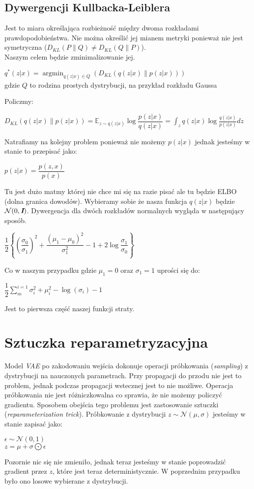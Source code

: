 \documentclass[a4paper,12pt]{book} %
\begin{document}
\subsection{Dywergencji Kullbacka-Leiblera}
Jest to miara określająca rozbieżność między dwoma rozkładami prawdopodobieństwa. Nie można określić jej mianem metryki ponieważ nie jest symetryczna ($D_{KL}(P\|Q)\neq  D_{KL}(Q\|P)$).\\ Naszym celem będzie zminimalizowanie jej.
\begin{center}
	$q^\ast(z|x)=\operatorname*{argmin}_{q(z|x)\in Q}(D_{KL}(q(z|x)\|p(z|x)))$
	\\gdzie $Q$ to rodzina prostych dystrybucji, na przykład rozkładu Gaussa 
\end{center}
Policzmy:
\begin{center}
	$D_{KL}(q(z|x)\|p(z|x))=\mathbb{E}_{z\sim q(z|x)}\log\dfrac{p(z|x)}{q(z|x)} = 
	\displaystyle\int_{z}^{}q(z|x)\log\frac{q(z|x)}{p(z|x)}dz$
\end{center}
	 Natrafiamy na kolejny problem ponieważ nie możemy $p(z|x)$ jednak jesteśmy w stanie to przepisać jako:\\
\begin{center}
	$p(z|x)=\dfrac{p(z,x)}{p(x)}$
\end{center}
Tu jest dużo matmy której nie chce mi się na razie pisać ale tu będzie ELBO (dolna granica dowodów).
\newpage
Wybieramy sobie że nasza funkcja $q(z|x)$ będzie $\mathcal{N}(0, \textit{\textbf{I}})$.
Dywergencja dla dwóch rozkładów normalnych wygląda w następujący sposób. 
\begin{center}
	$\dfrac{1}{2}\left\{\left(\dfrac{\sigma_0}{\sigma_1}\right)^2+\dfrac{(\mu_1 - \mu_0)^2}{\sigma_1^2} - 1 + 2\log\dfrac{\sigma_1}{\sigma_0}\right\}$
\end{center}
Co w naszym przypadku gdzie $\mu_1 = 0$ oraz $\sigma_1=1$ uprości się do:
\begin{center}
	$\dfrac{1}{2}\displaystyle\sum_{m}^{i=1}\sigma_i^2+\mu_i^2-\log(\sigma_i)-1$
\end{center} 
Jest to pierwsza część naszej funkcji straty. 
\newpage
\section{Sztuczka reparametryzacyjna}
Model \textit{VAE} po zakodowaniu wejścia dokonuje operacji próbkowania (\textit{sampling}) z dystrybucji na nauczonych parametrach. Przy propagacji do przodu nie jest to problem, jednak podczas propagacji wstecznej jest to nie możliwe. Operacja próbkowania nie jest różniczkowalna co sprawia, że nie możemy policzyć gradientu. Sposobem obejścia tego problemu jest zastosowanie sztuczki (\textit{reparameterization trick}). Próbkowanie z dystrybucji $z\sim\mathcal{N}(\mu, \sigma)$ jesteśmy w stanie zapisać jako:
\begin{center}
	$\epsilon\sim\mathcal{N}(0,1)$\\
	$z=\mu+\sigma\bigodot\epsilon$
\end{center} 
Pozornie nic się nie zmieniło, jednak teraz jesteśmy w stanie poprowadzić gradient przez $z$, które jest teraz deterministycznie. W poprzednim przypadku było ono losowe wybierane z dystrybucji. 
\end{document}

